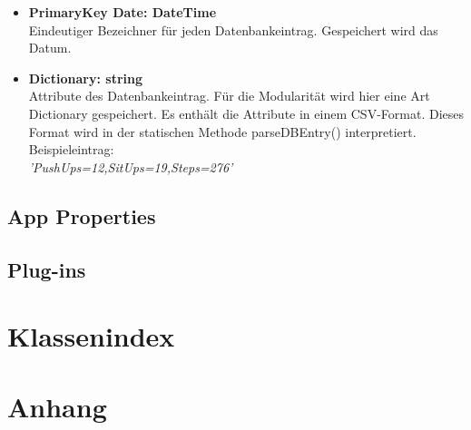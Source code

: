 \documentclass[a4paper,12pt]{article}
\begin{document}
\begin{itemize}
	\item[] \textbf{PrimaryKey Date: DateTime}\\Eindeutiger Bezeichner für jeden Datenbankeintrag. Gespeichert wird das Datum.
	\item[] \textbf{Dictionary: string}\\Attribute des Datenbankeintrag. Für die Modularität wird hier eine Art Dictionary gespeichert. Es enthält die Attribute in einem \gls{CSV}-Format. Dieses Format wird in der statischen Methode parseDBEntry() interpretiert. Beispieleintrag:\\ \textit{'PushUps=12,SitUps=19,Steps=276'}
\end{itemize}
 
\subsection{App Properties}

\subsection{Plug-ins}

\section{Klassenindex}
\section{Anhang}

\clearpage
\printglossaries
{}
\end{document}
